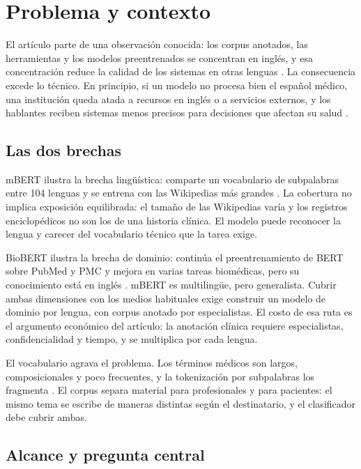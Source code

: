 \section{Problema y contexto}
\label{sec:problema}

El artículo parte de una observación conocida: los corpus anotados, las herramientas y los modelos preentrenados se concentran en inglés, y esa concentración reduce la calidad de los sistemas en otras lenguas \cite{piperno2025}. La consecuencia excede lo técnico. En principio, si un modelo no procesa bien el español médico, una institución queda atada a recursos en inglés o a servicios externos, y los hablantes reciben sistemas menos precisos para decisiones que afectan su salud \cite{piperno2025}.

\subsection{Las dos brechas}

mBERT ilustra la brecha lingüística: comparte un vocabulario de subpalabras entre 104 lenguas y se entrena con las Wikipedias más grandes \cite{devlin2019}. La cobertura no implica exposición equilibrada: el tamaño de las Wikipedias varía y los registros enciclopédicos no son los de una historia clínica. El modelo puede reconocer la lengua y carecer del vocabulario técnico que la tarea exige.

BioBERT ilustra la brecha de dominio: continúa el preentrenamiento de BERT sobre PubMed y PMC y mejora en varias tareas biomédicas, pero su conocimiento está en inglés \cite{lee2020}. mBERT es multilingüe, pero generalista. Cubrir ambas dimensiones con los medios habituales exige construir un modelo de dominio por lengua, con corpus anotado por especialistas. El costo de esa ruta es el argumento económico del artículo: la anotación clínica requiere especialistas, confidencialidad y tiempo, y se multiplica por cada lengua.

El vocabulario agrava el problema. Los términos médicos son largos, composicionales y poco frecuentes, y la tokenización por subpalabras los fragmenta \cite{lee2020}. El corpus separa material para profesionales y para pacientes: el mismo tema se escribe de maneras distintas según el destinatario, y el clasificador debe cubrir ambas.

\subsection{Alcance y pregunta central}

